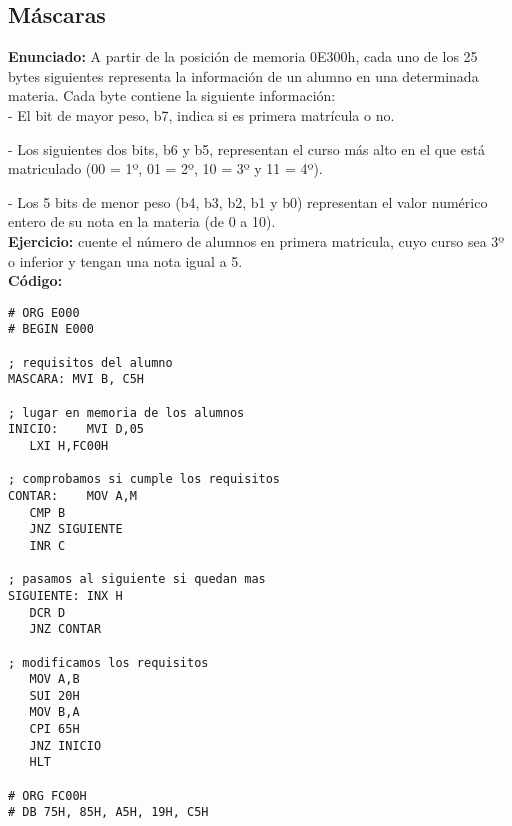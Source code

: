 \documentclass[12pt]{article}
\begin{document}
		\subsection{Máscaras}
		
			\textbf{Enunciado:} A partir de la posición de memoria 0E300h, cada uno de los 25 bytes siguientes representa la información de un alumno en una determinada materia.  Cada byte contiene la siguiente información:\\
			
			- El bit de mayor peso, b7, indica si es primera matrícula o no.
			
			- Los siguientes dos bits, b6 y b5, representan el  curso más alto en el que está matriculado (00 = 1º, 01 = 2º,  10 = 3º y 11 = 4º).
			
			- Los 5 bits de menor peso (b4, b3, b2, b1 y b0) representan el valor numérico entero de su nota en la materia (de 0 a 10).\\
			
			\textbf{Ejercicio:} cuente el número de 
alumnos en primera matricula, cuyo curso sea 3º o inferior y tengan una 
nota igual a 5.\\
			
			\textbf{Código:}\\
			
			\lstset{language=8085, breaklines=true, basicstyle=\footnotesize}
			\begin{lstlisting}[frame=single]
# ORG E000
# BEGIN E000

; requisitos del alumno
MASCARA: MVI B, C5H

; lugar en memoria de los alumnos
INICIO:	   MVI D,05
   LXI H,FC00H

; comprobamos si cumple los requisitos
CONTAR:	   MOV A,M
   CMP B
   JNZ SIGUIENTE
   INR C

; pasamos al siguiente si quedan mas     
SIGUIENTE: INX H
   DCR D
   JNZ CONTAR
   
; modificamos los requisitos
   MOV A,B
   SUI 20H
   MOV B,A
   CPI 65H
   JNZ INICIO
   HLT

# ORG FC00H
# DB 75H, 85H, A5H, 19H, C5H
			\end{lstlisting}
			
\end{document}
